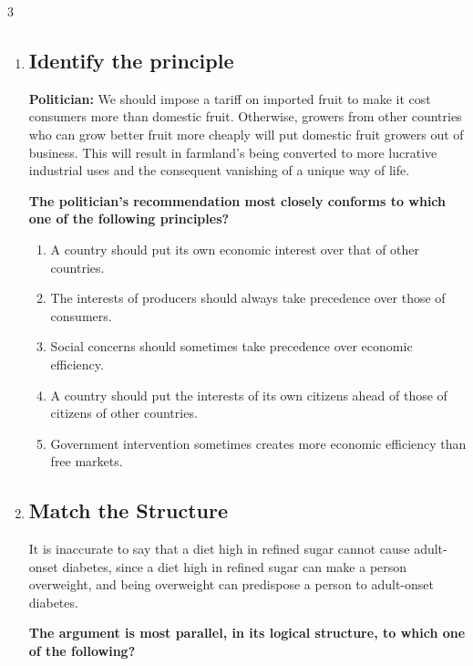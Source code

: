 \documentclass[9pt]{article}
\begin{document}
\begin{multicols}{3}
\begin{enumerate}
\item
\subsection*{Identify the principle}
\noindent
\textbf{Politician:} We should impose a tariff on imported fruit to make it cost consumers more than domestic fruit. Otherwise, growers from other countries who can grow better fruit more cheaply will put domestic fruit growers out of business. This will result in farmland's being converted to more lucrative industrial uses and the consequent vanishing of a unique way of life.

 

\noindent
\textbf{The politician's recommendation most closely conforms to which one of the following principles?}

\begin{enumerate}[label=(\alph*)]
    \item A country should put its own economic interest over that of other countries.
    \item The interests of producers should always take precedence over those of consumers.
    \item Social concerns should sometimes take precedence over economic efficiency.
    \item A country should put the interests of its own citizens ahead of those of citizens of other countries.
    \item Government intervention sometimes creates more economic efficiency than free markets.
\end{enumerate}

\item
\subsection*{Match the Structure}

\noindent
It is inaccurate to say that a diet high in refined sugar cannot cause adult-onset diabetes, since a diet high in refined sugar can make a person overweight, and being overweight can predispose a person to adult-onset diabetes.

 

\noindent
\textbf{The argument is most parallel, in its logical structure, to which one of the following?}


\end{enumerate}
\end{multicols}
\end{document}
